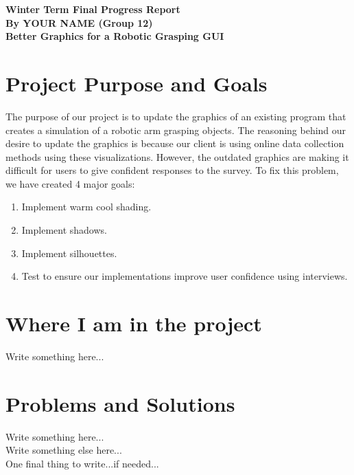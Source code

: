 \documentclass[10pt,journal,compsoc,draftclsnofoot]{IEEEtran}
\begin{document}
\onecolumn

\begin{flushleft}
\textbf{Winter Term Final Progress Report} \\
\textbf{By YOUR NAME (Group 12)} \\
\textbf{Better Graphics for a Robotic Grasping GUI}

\section{Project Purpose and Goals}
The purpose of our project is to update the graphics of an existing program that creates a simulation of a robotic arm grasping objects.
The reasoning behind our desire to update the graphics is because our client is using online data collection methods using these visualizations.
However, the outdated graphics are making it difficult for users to give confident responses to the survey.
To fix this problem, we have created 4 major goals:
\begin{enumerate}
\item Implement warm cool shading.
\item Implement shadows.
\item Implement silhouettes.
\item Test to ensure our implementations improve user confidence using interviews.
\end{enumerate}

\section{Where I am in the project}

Write something here... \\

\section{Problems and Solutions}

Write something here... \\
\vspace{3mm}
Write something else here... \\
\vspace{3mm}
One final thing to write...if needed... \\

\newpage


\end{flushleft}
\end{document}
